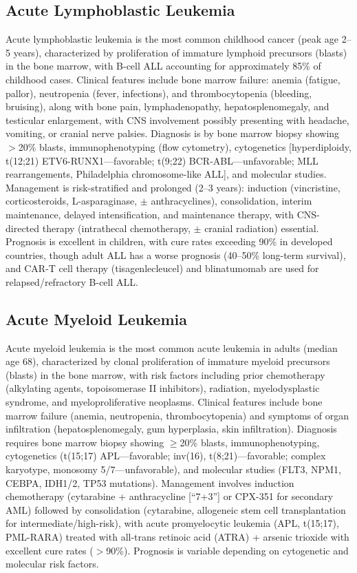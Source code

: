 \subsection{Acute Lymphoblastic Leukemia}
\label{sec:Acute Lymphoblastic Leukemia}
Acute lymphoblastic leukemia is the most common childhood cancer (peak age 2--5 years), characterized by proliferation of immature lymphoid precursors (blasts) in the bone marrow, with B-cell ALL accounting for approximately 85\% of childhood cases. Clinical features include bone marrow failure: anemia (fatigue, pallor), neutropenia (fever, infections), and thrombocytopenia (bleeding, bruising), along with bone pain, lymphadenopathy, hepatosplenomegaly, and testicular enlargement, with CNS involvement possibly presenting with headache, vomiting, or cranial nerve palsies. Diagnosis is by bone marrow biopsy showing $>$20\% blasts, immunophenotyping (flow cytometry), cytogenetics [hyperdiploidy, t(12;21) ETV6-RUNX1---favorable; t(9;22) BCR-ABL---unfavorable; MLL rearrangements, Philadelphia chromosome-like ALL], and molecular studies. Management is risk-stratified and prolonged (2--3 years): induction (vincristine, corticosteroids, L-asparaginase, $\pm$ anthracyclines), consolidation, interim maintenance, delayed intensification, and maintenance therapy, with CNS-directed therapy (intrathecal chemotherapy, $\pm$ cranial radiation) essential. Prognosis is excellent in children, with cure rates exceeding 90\% in developed countries, though adult ALL has a worse prognosis (40--50\% long-term survival), and CAR-T cell therapy (tisagenlecleucel) and blinatumomab are used for relapsed/refractory B-cell ALL.

\subsection{Acute Myeloid Leukemia}
\label{sec:Acute Myeloid Leukemia}
Acute myeloid leukemia is the most common acute leukemia in adults (median age 68), characterized by clonal proliferation of immature myeloid precursors (blasts) in the bone marrow, with risk factors including prior chemotherapy (alkylating agents, topoisomerase II inhibitors), radiation, myelodysplastic syndrome, and myeloproliferative neoplasms. Clinical features include bone marrow failure (anemia, neutropenia, thrombocytopenia) and symptoms of organ infiltration (hepatosplenomegaly, gum hyperplasia, skin infiltration). Diagnosis requires bone marrow biopsy showing $\geq$20\% blasts, immunophenotyping, cytogenetics (t(15;17) APL---favorable; inv(16), t(8;21)---favorable; complex karyotype, monosomy 5/7---unfavorable), and molecular studies (FLT3, NPM1, CEBPA, IDH1/2, TP53 mutations). Management involves induction chemotherapy (cytarabine + anthracycline [``7+3''] or CPX-351 for secondary AML) followed by consolidation (cytarabine, allogeneic stem cell transplantation for intermediate/high-risk), with acute promyelocytic leukemia (APL, t(15;17), PML-RARA) treated with all-trans retinoic acid (ATRA) + arsenic trioxide with excellent cure rates ($>$90\%). Prognosis is variable depending on cytogenetic and molecular risk factors.

